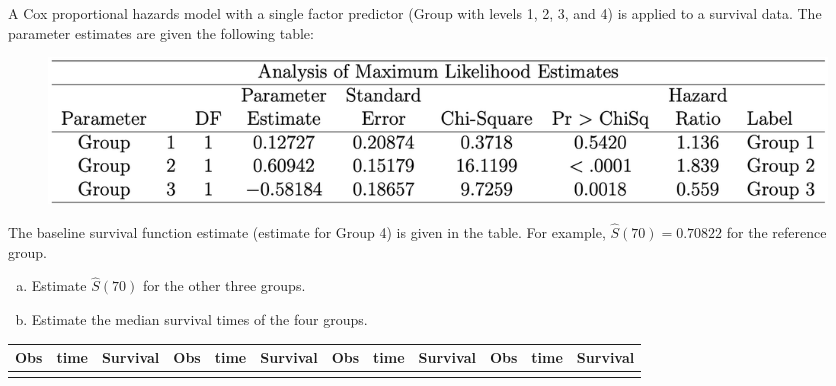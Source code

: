 \documentclass[12pt]{elegantbook}
\begin{document}
    \begin{exercise*}[3]
        A Cox proportional hazards model with a single factor predictor (Group with levels 1, 2, 3, and 4) is applied to a survival data. The parameter estimates are given the following table: 
        \begin{figure}[H]
            \centering
            \includegraphics[width=.95\textwidth]{h5_q3_1.png}
        \end{figure}
        The baseline survival function estimate (estimate for Group 4) is given in the table. For example, $\hat{S}(70)=0.70822$ for the reference group. 
        \begin{enumerate}[(a)]
            \item Estimate $\hat{S}(70)$ for the other three groups. 
            \item Estimate the median survival times of the four groups. 
        \end{enumerate}
        {\footnotesize
    \begin{longtable}[c]{lll|lll|lll|lll}
    \hline
    
    Obs & time & Survival & Obs & time & Survival & Obs & time & Survival & Obs & time & Survival \\ \hline
    \endfirsthead
    \endhead
    \hline
    \endfoot
    \endlastfoot
    

\end{longtable}}
\end{exercise*}
\end{document}
